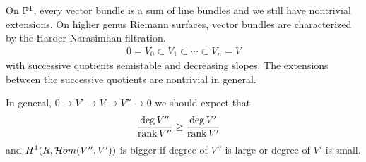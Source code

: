 \documentclass[12pt]{article}
\begin{document}
\begin{remark}
    On $\P^1$, every vector bundle is a sum of line bundles and we still have nontrivial extensions. On higher genus Riemann surfaces, vector bundles are characterized by the Harder-Narasimhan filtration. \begin{align*}
        0 = V_0 \subset V_1 \subset \cdots \subset V_n = V
    \end{align*} with successive quotients semistable and decreasing slopes. The extensions between the successive quotients are nontrivial in general.

    In general, $0 \to V' \to V \to V'' \to 0$ we should expect that \begin{align*}
        \frac{\deg V''}{\rank V''} &\geq \frac{\deg V'}{\rank V'}
    \end{align*} and $H^1(R, \cH om(V'', V'))$ is bigger if degree of $V''$ is large or degree of $V'$ is small.
\end{remark}
\end{document}
